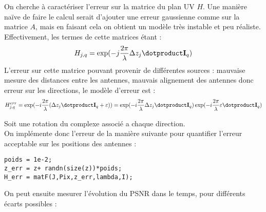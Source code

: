 \documentclass[titlepage]{article}
\begin{document}
	On cherche à caractériser l'erreur sur la matrice du plan UV $H$. Une manière naïve de faire le calcul serait d'ajouter une erreur gaussienne comme sur la matrice $A$, mais en faisant cela on obtient un modèle très instable et peu réaliste. Effectivement, les termes de cette matrices étant :
	$$
		H_{j,q} = \exp(-j\frac{2\pi}{\lambda}\Delta z_j\dotproduct\mathbf{I}_q)
	$$
	L'erreur sur cette matrice pouvant provenir de différentes sources : mauvaise mesure des distances entre les antennes, mauvais alignement des antennes donc erreur sur les directions, le modèle d'erreur est :
	$$
		H_{j,q}^{err} =  \exp(-i\frac{2\pi}{\lambda}(\Delta z_j\dotproduct\mathbf{I}_q + \varepsilon)) =  \exp(-i\frac{2\pi}{\lambda}\Delta z_j\dotproduct\mathbf{I}_q)\exp(-i\frac{2\pi}{\lambda}\varepsilon\dotproduct\mathbf{I}_q)
	$$
	
	Soit une rotation du complexe associé a chaque direction. \\
	
	On implémente donc l'erreur de la manière suivante pour quantifier l'erreur acceptable sur les positions des antennes :
	
	\begin{verbatim}
poids = 1e-2;
z_err = z+ randn(size(z))*poids;
H_err = matF(J,Pix,z_err,lambda,I);
	\end{verbatim}

	On peut ensuite mesurer l'évolution du PSNR dans le temps, pour différents écarts possibles :
	
%	
%	
	
\end{document}
